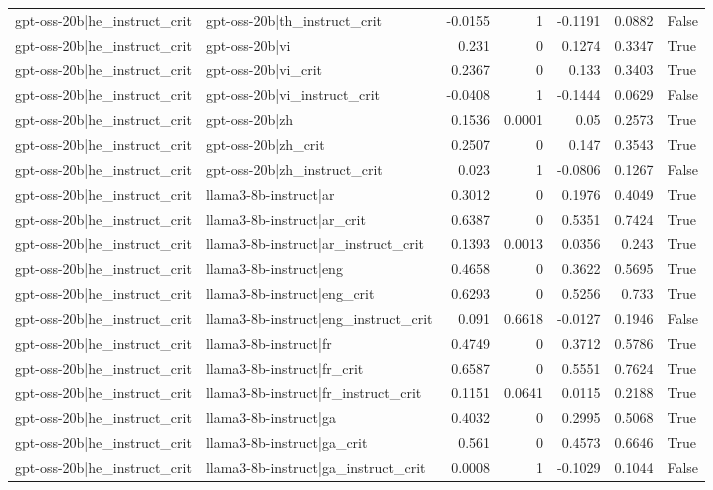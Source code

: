 \begin{table}
\begin{tabular}{l l r r r r l}
gpt-oss-20b|he_instruct_crit & gpt-oss-20b|th_instruct_crit & -0.0155 & 1 & -0.1191 & 0.0882 & False \\
gpt-oss-20b|he_instruct_crit & gpt-oss-20b|vi & 0.231 & 0 & 0.1274 & 0.3347 & True \\
gpt-oss-20b|he_instruct_crit & gpt-oss-20b|vi_crit & 0.2367 & 0 & 0.133 & 0.3403 & True \\
gpt-oss-20b|he_instruct_crit & gpt-oss-20b|vi_instruct_crit & -0.0408 & 1 & -0.1444 & 0.0629 & False \\
gpt-oss-20b|he_instruct_crit & gpt-oss-20b|zh & 0.1536 & 0.0001 & 0.05 & 0.2573 & True \\
gpt-oss-20b|he_instruct_crit & gpt-oss-20b|zh_crit & 0.2507 & 0 & 0.147 & 0.3543 & True \\
gpt-oss-20b|he_instruct_crit & gpt-oss-20b|zh_instruct_crit & 0.023 & 1 & -0.0806 & 0.1267 & False \\
gpt-oss-20b|he_instruct_crit & llama3-8b-instruct|ar & 0.3012 & 0 & 0.1976 & 0.4049 & True \\
gpt-oss-20b|he_instruct_crit & llama3-8b-instruct|ar_crit & 0.6387 & 0 & 0.5351 & 0.7424 & True \\
gpt-oss-20b|he_instruct_crit & llama3-8b-instruct|ar_instruct_crit & 0.1393 & 0.0013 & 0.0356 & 0.243 & True \\
gpt-oss-20b|he_instruct_crit & llama3-8b-instruct|eng & 0.4658 & 0 & 0.3622 & 0.5695 & True \\
gpt-oss-20b|he_instruct_crit & llama3-8b-instruct|eng_crit & 0.6293 & 0 & 0.5256 & 0.733 & True \\
gpt-oss-20b|he_instruct_crit & llama3-8b-instruct|eng_instruct_crit & 0.091 & 0.6618 & -0.0127 & 0.1946 & False \\
gpt-oss-20b|he_instruct_crit & llama3-8b-instruct|fr & 0.4749 & 0 & 0.3712 & 0.5786 & True \\
gpt-oss-20b|he_instruct_crit & llama3-8b-instruct|fr_crit & 0.6587 & 0 & 0.5551 & 0.7624 & True \\
gpt-oss-20b|he_instruct_crit & llama3-8b-instruct|fr_instruct_crit & 0.1151 & 0.0641 & 0.0115 & 0.2188 & True \\
gpt-oss-20b|he_instruct_crit & llama3-8b-instruct|ga & 0.4032 & 0 & 0.2995 & 0.5068 & True \\
gpt-oss-20b|he_instruct_crit & llama3-8b-instruct|ga_crit & 0.561 & 0 & 0.4573 & 0.6646 & True \\
gpt-oss-20b|he_instruct_crit & llama3-8b-instruct|ga_instruct_crit & 0.0008 & 1 & -0.1029 & 0.1044 & False \\

\end{tabular}
\end{table}
